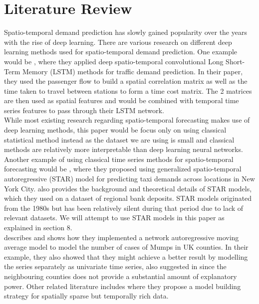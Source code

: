 \documentclass[nonblindrev,msom]{informs3} %
\begin{document}
\newpage
\section{Literature Review}

\noindent Spatio-temporal demand prediction has slowly gained popularity over the years with the rise of deep learning. There are various research on different deep learning methods used for spatio-temporal demand prediction. One example would be \cite{Wang2018}, where they applied deep spatio-temporal convolutional Long Short-Term Memory (LSTM) methods for traffic demand prediction. In their paper, they used the passenger flow to build a spatial correlation matrix as well as the time taken to travel between stations to form a time cost matrix. The 2 matrices are then used as spatial features and would be combined with temporal time series features to pass through their LSTM network. \\

\noindent While most existing research regarding spatio-temporal forecasting makes use of deep learning methods, this paper would be focus only on using classical statistical method instead as the dataset we are using is small and classical methods are relatively more interpretable than deep learning neural networks. Another example of using classical time series methods for spatio-temporal forecasting would be \cite{Abolfazl2017}, where they proposed using generalized spatio-temporal autoregressive (STAR) model for predicting taxi demands across locations in New York City. \cite{KURT20152537} also provides the background and theoretical details of STAR models, which they used on a dataset of regional bank deposits. STAR models originated from the 1980s but has been relatively silent during that period due to lack of relevant datasets. We will attempt to use STAR models in this paper as explained in section 8. \\

\noindent \cite{Marina2016} describes and shows how they implemented a network autoregressive moving average model to model the number of cases of Mumps in UK counties. In their example, they also showed that they might achieve a better result by modelling the series separately as univariate time series, also suggested in \cite{Nunes2015} since the neighbouring counties does not provide a substantial amount of explanatory power.  Other related literature includes \cite{Xavier2005} where they propose a model building strategy for spatially sparse but temporally rich data. \\
\end{document}

